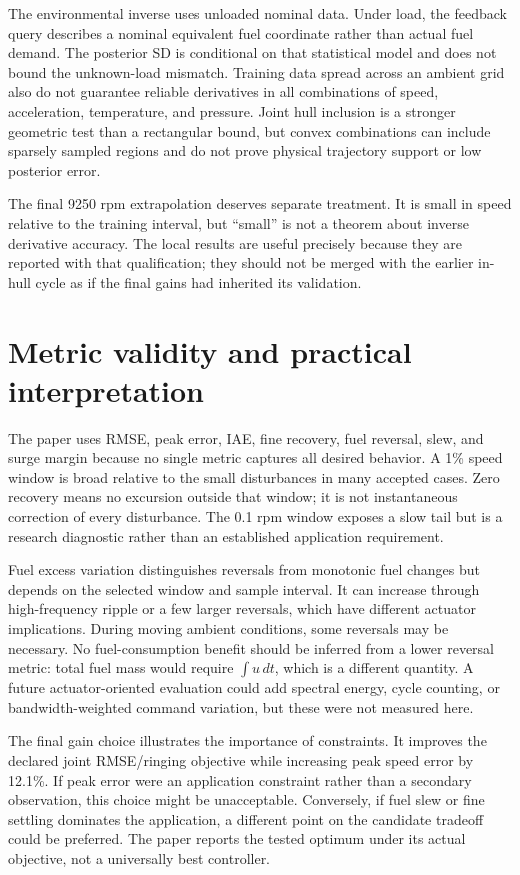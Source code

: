 \documentclass[11pt,a4paper,oneside]{report}
\begin{document}
The environmental inverse uses unloaded nominal data. Under load, the feedback query describes a nominal equivalent fuel coordinate rather than actual fuel demand. The posterior SD is conditional on that statistical model and does not bound the unknown-load mismatch. Training data spread across an ambient grid also do not guarantee reliable derivatives in all combinations of speed, acceleration, temperature, and pressure. Joint hull inclusion is a stronger geometric test than a rectangular bound, but convex combinations can include sparsely sampled regions and do not prove physical trajectory support or low posterior error.

The final 9250 rpm extrapolation deserves separate treatment. It is small in speed relative to the training interval, but ``small'' is not a theorem about inverse derivative accuracy. The local results are useful precisely because they are reported with that qualification; they should not be merged with the earlier in-hull cycle as if the final gains had inherited its validation.

\section{Metric validity and practical interpretation}
The paper uses RMSE, peak error, IAE, fine recovery, fuel reversal, slew, and surge margin because no single metric captures all desired behavior. A 1\% speed window is broad relative to the small disturbances in many accepted cases. Zero recovery means no excursion outside that window; it is not instantaneous correction of every disturbance. The 0.1 rpm window exposes a slow tail but is a research diagnostic rather than an established application requirement.

Fuel excess variation distinguishes reversals from monotonic fuel changes but depends on the selected window and sample interval. It can increase through high-frequency ripple or a few larger reversals, which have different actuator implications. During moving ambient conditions, some reversals may be necessary. No fuel-consumption benefit should be inferred from a lower reversal metric: total fuel mass would require $\int u\,dt$, which is a different quantity. A future actuator-oriented evaluation could add spectral energy, cycle counting, or bandwidth-weighted command variation, but these were not measured here.

The final gain choice illustrates the importance of constraints. It improves the declared joint RMSE/ringing objective while increasing peak speed error by 12.1\%. If peak error were an application constraint rather than a secondary observation, this choice might be unacceptable. Conversely, if fuel slew or fine settling dominates the application, a different point on the candidate tradeoff could be preferred. The paper reports the tested optimum under its actual objective, not a universally best controller.
\end{document}
